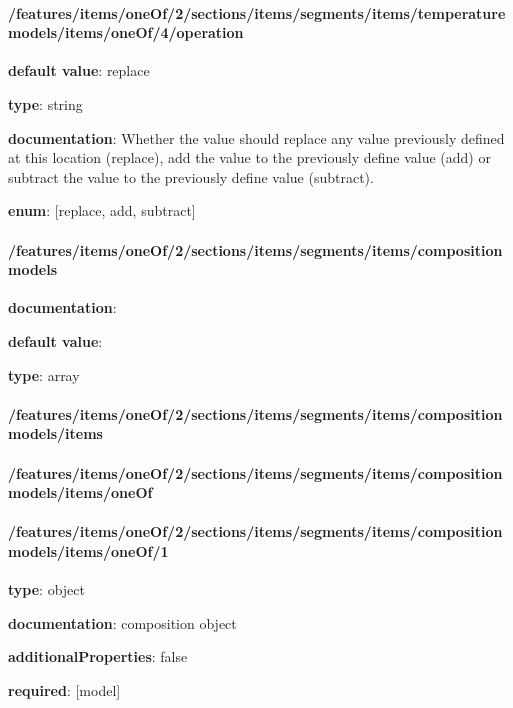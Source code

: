 \begin{itemized}
\end{itemized}\paragraph{/features/items/oneOf/2/sections/items/segments/items/temperature models/items/oneOf/4/operation} \begin{itemized}
\item {\bf default value}: replace
\item {\bf type}: string
\item {\bf documentation}: Whether the value should replace any value previously defined at this location (replace), add the value to the previously define value (add) or subtract the value to the previously define value (subtract).
\item {\bf enum}: [replace, add, subtract]\end{itemized}\paragraph{/features/items/oneOf/2/sections/items/segments/items/composition models} \begin{itemized}
\item {\bf documentation}: 
\item {\bf default value}: 
\item {\bf type}: array
\paragraph{/features/items/oneOf/2/sections/items/segments/items/composition models/items} \begin{itemized}
\end{itemized}\end{itemized}\paragraph{/features/items/oneOf/2/sections/items/segments/items/composition models/items/oneOf} \begin{itemized}
\end{itemized}\paragraph{/features/items/oneOf/2/sections/items/segments/items/composition models/items/oneOf/1} \begin{itemized}
\item {\bf type}: object
\item {\bf documentation}: composition object
\item {\bf additionalProperties}: false
\item {\bf required}: [model]\end{itemized}
